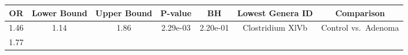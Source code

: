 \documentclass[12pt,]{article}
\begin{document}
\begin{longtable}[]{@{}ccccccc@{}}
\toprule
\begin{minipage}[b]{0.06\columnwidth}\centering\strut
OR\strut
\end{minipage} & \begin{minipage}[b]{0.10\columnwidth}\centering\strut
Lower Bound\strut
\end{minipage} & \begin{minipage}[b]{0.10\columnwidth}\centering\strut
Upper Bound\strut
\end{minipage} & \begin{minipage}[b]{0.08\columnwidth}\centering\strut
P-value\strut
\end{minipage} & \begin{minipage}[b]{0.08\columnwidth}\centering\strut
BH\strut
\end{minipage} & \begin{minipage}[b]{0.23\columnwidth}\centering\strut
Lowest Genera ID\strut
\end{minipage} & \begin{minipage}[b]{0.16\columnwidth}\centering\strut
Comparison\strut
\end{minipage}\tabularnewline
\midrule
\endhead
\begin{minipage}[t]{0.06\columnwidth}\centering\strut
1.46\strut
\end{minipage} & \begin{minipage}[t]{0.10\columnwidth}\centering\strut
1.14\strut
\end{minipage} & \begin{minipage}[t]{0.10\columnwidth}\centering\strut
1.86\strut
\end{minipage} & \begin{minipage}[t]{0.08\columnwidth}\centering\strut
2.29e-03\strut
\end{minipage} & \begin{minipage}[t]{0.08\columnwidth}\centering\strut
2.20e-01\strut
\end{minipage} & \begin{minipage}[t]{0.23\columnwidth}\centering\strut
Clostridium XlVb\strut
\end{minipage} & \begin{minipage}[t]{0.16\columnwidth}\centering\strut
Control vs.~Adenoma\strut
\end{minipage}\tabularnewline
\begin{minipage}[t]{0.06\columnwidth}\centering\strut
1.77\strut
\end{minipage} & \begin{minipage}[t]{0.10\columnwidth}\centering\strut

\end{minipage}
\end{longtable}
\end{document}
